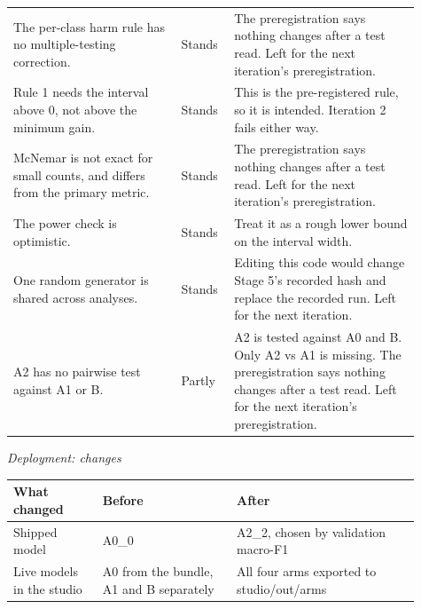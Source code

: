 \begin{tabular}{p{0.38\linewidth}p{0.11\linewidth}p{0.42\linewidth}}
The per-class harm rule has no multiple-testing correction. & Stands & The preregistration says nothing changes after a test read. Left for the next iteration's preregistration. \\
Rule 1 needs the interval above 0, not above the minimum gain. & Stands & This is the pre-registered rule, so it is intended. Iteration 2 fails either way. \\
McNemar is not exact for small counts, and differs from the primary metric. & Stands & The preregistration says nothing changes after a test read. Left for the next iteration's preregistration. \\
The power check is optimistic. & Stands & Treat it as a rough lower bound on the interval width. \\
One random generator is shared across analyses. & Stands & Editing this code would change Stage 5's recorded hash and replace the recorded run. Left for the next iteration. \\
A2 has no pairwise test against A1 or B. & Partly & A2 is tested against A0 and B. Only A2 vs A1 is missing. The preregistration says nothing changes after a test read. Left for the next iteration's preregistration. \\
\bottomrule
\end{tabular}

\medskip

\textit{Deployment: changes}

\begin{tabular}{p{0.20\linewidth}p{0.30\linewidth}p{0.41\linewidth}}
\toprule
What changed & Before & After \\
\midrule
Shipped model & A0\_0 & A2\_2, chosen by validation macro-F1 \\
Live models in the studio & A0 from the bundle, A1 and B separately & All four arms exported to studio/out/arms \\
\bottomrule
\end{tabular}
